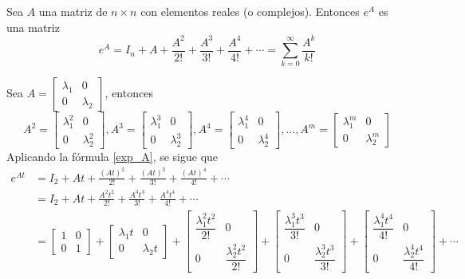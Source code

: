\begin{definition}
    Sea $A$ una matriz de $n \times n$ con elementos reales (o complejos). Entonces $e^A$ es una matriz
    \begin{equation}
        e^A = I_n + A + \frac{A^2}{2!} + \frac{A^3}{3!} + \frac{A^4}{4!} + \cdots = \sum_{k=0}^{\infty} \frac{A^k}{k!} \label{exp_A}
    \end{equation}
\end{definition}

\begin{example}
    Sea $A = \begin{bmatrix} \lambda_1 & 0 \\ 0 & \lambda_2 \end{bmatrix}$, entonces
    $$A^2 = \begin{bmatrix} \lambda_1^2 & 0 \\ 0 & \lambda_2^2 \end{bmatrix}, A^3 = \begin{bmatrix} \lambda_1^3 & 0 \\ 0 & \lambda_2^3 \end{bmatrix}, A^4 = \begin{bmatrix} \lambda_1^4 & 0 \\ 0 & \lambda_2^4 \end{bmatrix}, \dots, A^m = \begin{bmatrix} \lambda_1^m & 0 \\ 0 & \lambda_2^m \end{bmatrix}$$
    Aplicando la fórmula \eqref{exp_A}, se sigue que
    \begin{align*}
        e^{At} & = I_2 + At + \frac{(At)^2}{2!} + \frac{(At)^3}{3!} + \frac{(At)^4}{4!} + \cdots \\
        & = I_2 + At + \frac{A^2t^2}{2!} + \frac{A^3t^3}{3!} + \frac{A^4t^4}{4!} + \cdots \\
        & = \begin{bmatrix} 1 & 0 \\ 0 & 1 \end{bmatrix} + \begin{bmatrix} \lambda_1 t & 0 \\ 0 & \lambda_2 t \end{bmatrix} + \begin{bmatrix} \dfrac{\lambda_1^2 t^2}{2!} & 0 \\[2mm] 0 & \dfrac{\lambda_2^2 t^2}{2!} \end{bmatrix} + \begin{bmatrix} \dfrac{\lambda_1^3 t^3}{3!} & 0 \\[2mm] 0 & \dfrac{\lambda_2^3 t^3}{3!} \end{bmatrix} + \begin{bmatrix} \dfrac{\lambda_1^4 t^4}{4!} & 0 \\[2mm] 0 & \dfrac{\lambda_2^4 t^4}{4!} \end{bmatrix} + \cdots \\

\end{align*}
\end{example}
